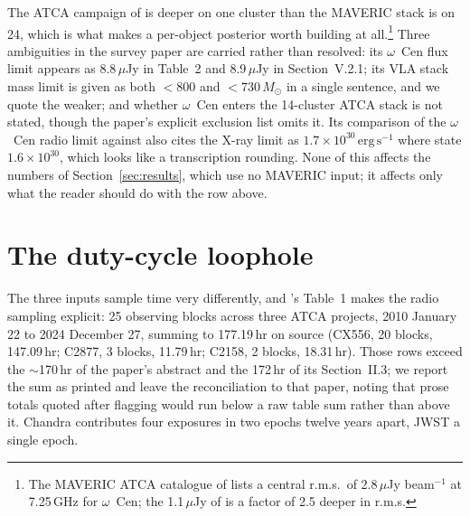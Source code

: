 \documentclass[11pt]{article}
\newcommand{\msun}{\ensuremath{M_\odot}}
\newcommand{\ocen}{$\omega$~Cen}
\begin{document}
The ATCA campaign of \citet{Mahida2026} is deeper on one cluster than the MAVERIC stack is on 24, which is what makes a per-object posterior worth building at all.\footnote{The MAVERIC ATCA catalogue of \citet{Tudor2022} lists a central r.m.s.\ of 2.8\,$\mu$Jy beam$^{-1}$ at 7.25\,GHz for \ocen{}; the 1.1\,$\mu$Jy of \citet{Mahida2026} is a factor of 2.5 deeper in r.m.s.} Three ambiguities in the survey paper are carried rather than resolved: its \ocen{} flux limit appears as 8.8\,$\mu$Jy in Table~2 and 8.9\,$\mu$Jy in Section~V.2.1; its VLA stack mass limit is given as both $<800$ and $<730\,\msun$ in a single sentence, and we quote the weaker; and whether \ocen{} enters the 14-cluster ATCA stack is not stated, though the paper's explicit exclusion list omits it. Its comparison of the \ocen{} radio limit against \citet{Haggard2013} also cites the X-ray limit as $1.7\times10^{30}\,\mathrm{erg\,s^{-1}}$ where \citeauthor{Haggard2013} state $1.6\times10^{30}$, which looks like a transcription rounding. None of this affects the numbers of Section~\ref{sec:results}, which use no MAVERIC input; it affects only what the reader should do with the row above.

\section{The duty-cycle loophole}
\label{sec:duty}

The three inputs sample time very differently, and \citet{Mahida2026}'s Table~1 makes the radio sampling explicit: 25 observing blocks across three ATCA projects, 2010 January 22 to 2024 December 27, summing to 177.19\,hr on source (CX556, 20 blocks, 147.09\,hr; C2877, 3 blocks, 11.79\,hr; C2158, 2 blocks, 18.31\,hr). Those rows exceed the $\sim$170\,hr of the paper's abstract and the 172\,hr of its Section~II.3; we report the sum as printed and leave the reconciliation to that paper, noting that prose totals quoted after flagging would run below a raw table sum rather than above it. Chandra contributes four exposures in two epochs twelve years apart, JWST a single epoch.
\end{document}

